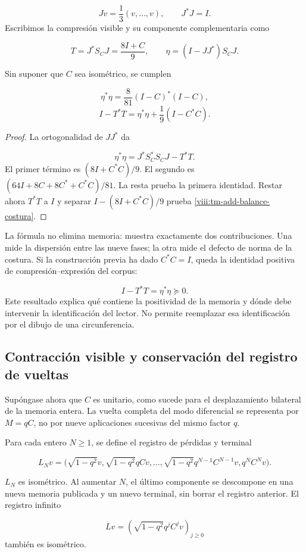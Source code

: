 \[
Jv=\frac13(v,\ldots,v),\qquad J^*J=I.
\]
Escribimos la compresión visible y su componente complementaria como

\[
T=J^*S_CJ=\frac{8I+C}{9},\qquad
\eta=(I-JJ^*)S_CJ.
\]
\begin{proposition}
\label{viii:tm-add-proposicion-costura-1}
Sin suponer que \(C\) sea isométrico, se cumplen

\[
\eta^*\eta=\frac8{81}(I-C)^*(I-C),
\]
\begin{equation}
\boxed{I-T^*T=\eta^*\eta+\frac19(I-C^*C).}
\label{viii:tm-add-balance-costura}
\end{equation}
\end{proposition}

\begin{proof}
La ortogonalidad de \(JJ^*\) da

\[
\eta^*\eta=J^*S_C^*S_CJ-T^*T.
\]
El primer término es \((8I+C^*C)/9\). El segundo es \((64I+8C+8C^*+C^*C)/81\). La resta prueba la primera identidad. Restar ahora \(T^*T\) a \(I\) y separar \(I-(8I+C^*C)/9\) prueba \eqref{viii:tm-add-balance-costura}.
\end{proof}

La fórmula no elimina memoria: muestra exactamente dos contribuciones. Una mide la dispersión entre las nueve fases; la otra mide el defecto de norma de la costura. Si la construcción previa ha dado \(C^*C=I\), queda la identidad positiva de compresión–expresión del corpus:

\[
I-T^*T=\eta^*\eta\succeq0.
\]
Este resultado explica qué contiene la positividad de la memoria y dónde debe intervenir la identificación del lector. No permite reemplazar esa identificación por el dibujo de una circunferencia.


\subsection{Contracción visible y conservación del registro de vueltas}
\label{viii:tm-add-c3}
Supóngase ahora que \(C\) es unitario, como sucede para el desplazamiento bilateral de la memoria entera. La vuelta completa del modo diferencial se representa por \(M=qC\), no por nueve aplicaciones sucesivas del mismo factor \(q\).

Para cada entero \(N\geq1\), se define el registro de pérdidas y terminal

\[
L_Nv=\bigl(\sqrt{1-q^2}v,
\sqrt{1-q^2}qCv,\ldots,
\sqrt{1-q^2}q^{N-1}C^{N-1}v, q^NC^Nv\bigr).
\]
\begin{proposition}
\label{viii:tm-add-proposicion-costura-2}
\(L_N\) es isométrico. Al aumentar \(N\), el último componente se descompone en una nueva memoria publicada y un nuevo terminal, sin borrar el registro anterior. El registro infinito

\[
Lv=\left(\sqrt{1-q^2}q^jC^jv\right)_{j\geq0}
\]
también es isométrico.
\end{proposition}

